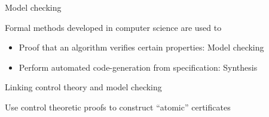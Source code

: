 \documentclass[usenames,dvipsnames,xcolor=table]{beamer}
\begin{document}
\begin{frame}{Model checking}
\begin{center}
Formal methods developed in computer science are used to 
\begin{itemize}
	\item Proof that an algorithm verifies certain properties: Model checking
	\item Perform automated code-generation from specification: Synthesis
\end{itemize}

\end{center}
\end{frame}


\begin{frame}{Linking control theory and model checking}
\begin{center}
Use control theoretic proofs to construct ``atomic'' certificates



\end{center}
\end{frame}
\end{document}
